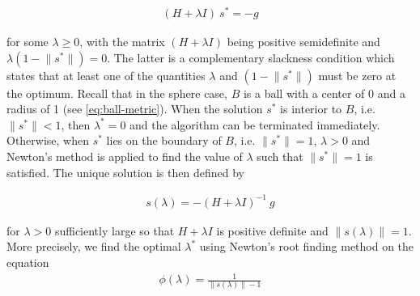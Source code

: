 

\begin{align}
    ( H + \lambda I ) \ s^* = - g
    \label{eq:gqtpar-exact-solution}
\end{align}

\noindent for some $\lambda \geq 0$, with the matrix $( H + \lambda I )$ being positive semidefinite and
$\lambda (1  - \lVert s^* \rVert) = 0$. The latter is a complementary slackness condition
which states that at least one of the quantities $\lambda$ and $(1  - \lVert s^* \rVert)$
must be zero at the optimum. Recall that in the sphere case, $B$ is a ball with a center of 0 and a radius of 1 (see \ref{eq:ball-metric}).
When the solution $s^*$ is interior to $B$, i.e. $\lVert s^* \rVert < 1$,
then $\lambda^*= 0$ and the algorithm can be terminated immediately.
Otherwise, when $s^*$ lies on the boundary of $B$, i.e. $\lVert s^* \rVert = 1$,
$\lambda > 0$ and Newton's method is applied to find the value of $\lambda$ such that
$\lVert s^* \rVert = 1$ is satisfied.
The unique solution is then defined by

\begin{align}
    s (\lambda) = -(H + \lambda I)^{-1} \ g
    \label{eq:gqtpar-boundary-solution}
\end{align}

\noindent for $\lambda> 0$ sufficiently large so that $H + \lambda I$ is positive definite and $ \lVert s (\lambda) \rVert = 1$.
More precisely, we find the optimal $\lambda^*$ using Newton's root finding method on the equation
\begin{align}
    \phi(\lambda)=\frac{1}{\|s(\lambda)\| - 1}
    \label{eq:root-finding}
\end{align}

